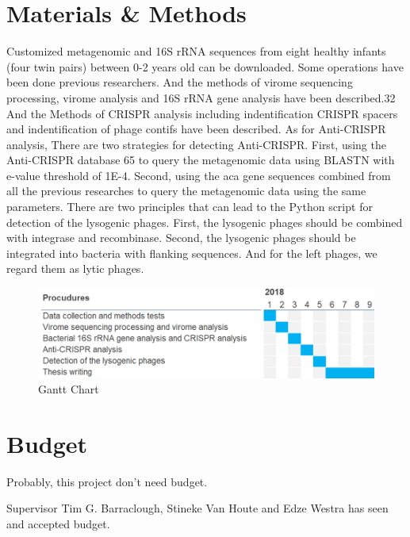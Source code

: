\documentclass[a4paper][11pt][titlepage]{article}
\begin{document}
  \section{Materials \& Methods}  
  Customized metagenomic and 16S rRNA sequences from eight healthy infants (four twin 
  pairs) between 0-2 years old\cite{lim2015early} can be downloaded. Some operations have been done 
  previous researchers. And the methods of virome sequencing processing, virome analysis 
  and 16S rRNA gene analysis have been described.32 And the Methods of CRISPR analysis including 
  indentification CRISPR spacers and indentification of phage contifs have been described.\cite{stern2012crispr} 
  As for Anti-CRISPR analysis, There are two strategies for detecting Anti-CRISPR. First, 
  using the Anti-CRISPR database 65 to query the metagenomic data using BLASTN with e-value 
  threshold of 1E-4. Second, using the aca gene sequences combined from all the previous 
  researches to query the metagenomic data using the same parameters. There are two principles\cite{stern2012crispr} 
  that can lead to the Python script for detection of the lysogenic phages. First, the lysogenic 
  phages should be combined with integrase and recombinase. Second, the lysogenic phages 
  should be integrated into bacteria with flanking sequences. And for the left phages, 
  we regard them as lytic phages.

	\begin{figure}[h]  
  \centering
			\includegraphics{gatt.png}
      \caption{Gantt Chart}
      \end{figure}
    
    
  


	
	
	
	\section{Budget}
	
	Probably, this project don't need budget.
    
    Supervisor Tim G. Barraclough, Stineke Van Houte and Edze Westra has seen and accepted 
    budget.
  
  
  
\end{document}
